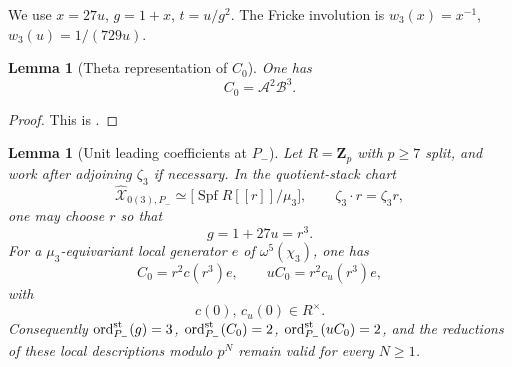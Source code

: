 \documentclass[11pt]{amsart}
\newtheorem{lemma}[theorem]{Lemma}
\theoremstyle{definition}
\theoremstyle{remark}
\newcommand{\Z}{\mathbf{Z}}
\newcommand{\ord}{\operatorname{ord}}
\begin{document}
We use $x=27u$, $g=1+x$, $t=u/g^2$. The Fricke involution is $w_3(x)=x^{-1}$, $w_3(u)=1/(729u)$.

\begin{lemma}[Theta representation of $C_0$]\label{lem:C0-theta-representation}
One has
\[
C_0=\mathcal A^2\mathcal B^3.
\]
\end{lemma}

\begin{proof}
This is .
\end{proof}

\begin{lemma}[Unit leading coefficients at $P_-$]\label{lem:Pminus-unit-leading}\label{lem:stack-P-minus}
Let $R=\Z_p$ with $p\ge 7$ split, and work after adjoining $\zeta_3$ if necessary. In the quotient-stack chart
\[
\widehat{\mathcal X}_{0(3),P_-}\simeq \bigl[\operatorname{Spf}R[[r]]/\mu_3\bigr],
\qquad \zeta_3\cdot r=\zeta_3 r,
\]
one may choose $r$ so that
\[
g=1+27u=r^3.
\]
For a $\mu_3$-equivariant local generator $e$ of $\omega^5(\chi_3)$, one has
\[
C_0=r^2c(r^3)e,\qquad uC_0=r^2c_u(r^3)e,
\]
with
\[
c(0),\,c_u(0)\in R^\times.
\]
Consequently $\ord^{\rm st}_{P_-}(g)=3$, $\ord^{\rm st}_{P_-}(C_0)=2$, $\ord^{\rm st}_{P_-}(uC_0)=2$, and the reductions of these local descriptions modulo $p^N$ remain valid for every $N\ge 1$.
\end{lemma}
\end{document}
